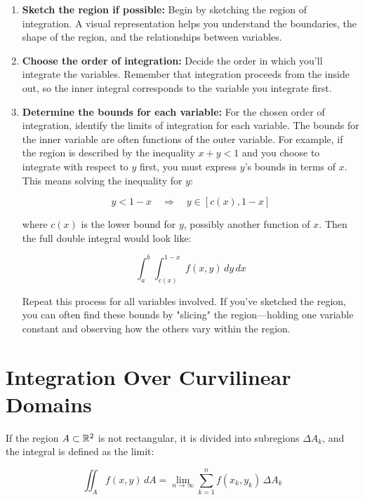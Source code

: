 \begin{enumerate}

    \item \textbf{Sketch the region if possible:} Begin by sketching the region of integration.  
    A visual representation helps you understand the boundaries, the shape of the region, and the relationships between variables.

    \item \textbf{Choose the order of integration:} Decide the order in which you'll integrate the 
    variables. Remember that integration proceeds from the inside out, so the inner integral corresponds to 
    the variable you integrate first.

    \item \textbf{Determine the bounds for each variable: }  For the chosen order of integration, identify 
    the limits of integration for each variable. The bounds for the inner variable are often functions of 
    the outer variable.  For example, if the region is described by the inequality \(x + y < 1\) and you 
    choose to integrate with respect to \(y\) first, you must express \(y\)'s bounds in terms of \(x\). 
    This means solving the inequality for \(y\):  

    \[
        y < 1 - x \quad \Rightarrow \quad y \in [c(x), 1 - x]
    \]  

    where \(c(x)\) is the lower bound for \(y\), possibly another function of \(x\). Then the full double 
    integral would look like:

    \[
        \int_{a}^{b} \int_{c(x)}^{1 - x} f(x, y) \, dy \, dx
    \]  

    Repeat this process for all variables involved. If you’ve sketched the region, you can often find these 
    bounds by "slicing" the region—holding one variable constant and observing how the others vary within 
    the region.

\end{enumerate}

\section{Integration Over Curvilinear Domains}

If the region \( A \subset \mathbb{R}^2 \) is not rectangular, it is divided into subregions 
\( \Delta A_k \), and the integral is defined as the limit:

\[
    \iint_A f(x, y)\, dA = \lim_{n \to \infty} \sum_{k=1}^n f(x_k, y_k) \, \Delta A_k
\]

